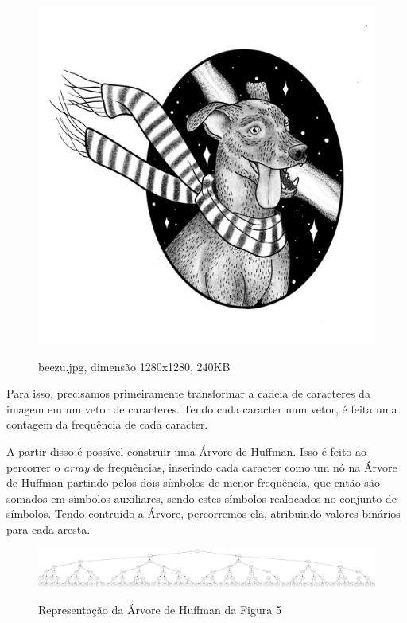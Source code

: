 \begin{figure}[h]
\caption{\small beezu.jpg, dimensão 1280x1280, 240KB}
\centering
\includegraphics[scale=0.25]{figs/beezu.jpg}
\label{f.imagebeezu}
\end{figure}

Para isso, precisamos primeiramente transformar a cadeia de caracteres da imagem em um vetor de caracteres. Tendo cada caracter num vetor, é feita uma contagem da frequência de cada caracter.

A partir disso é possível construir uma Árvore de Huffman. Isso é feito ao percorrer o {\em array} de frequências, inserindo cada caracter como um nó na Árvore de Huffman partindo pelos dois símbolos de menor frequência, que então são somados em símbolos auxiliares, sendo estes símbolos realocados no conjunto de símbolos. Tendo contruído a Árvore, percorremos ela, atribuindo valores binários para cada aresta.

\begin{figure}[h]
\caption{\small Representação da Árvore de Huffman da Figura 5}
\centering
\includegraphics[scale=0.08]{figs/beezu_huffman.PNG}
\label{f.imagebeezutree}
\end{figure}

